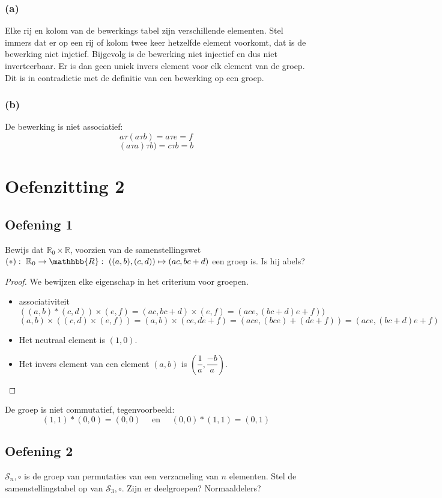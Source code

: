 \documentclass[main.tex]{subfiles}
\begin{document}
\subsubsection*{(a)}
Elke rij en kolom van de bewerkings tabel zijn verschillende elementen.
Stel immers dat er op een rij of kolom twee keer hetzelfde element voorkomt, dat is de bewerking niet injetief.
Bijgevolg is de bewerking niet injectief en dus niet inverteerbaar.
Er is dan geen uniek invers element voor elk element van de groep.
Dit is in contradictie met de definitie van een bewerking op een groep.

\subsubsection*{(b)}
De bewerking is niet associatief:
\[
a \tau (a \tau b)=a \tau e=f
\]
\[
(a \tau a) \tau b)=c \tau b=b
\]

\section{Oefenzitting 2}
\subsection*{Oefening 1}

Bewijs dat $\mathbb{R}_0 \times \mathbb{R}$, voorzien van de samenstellingswet $(*):\ \mathbb{R}_{0}\rightarrow \mathhbb{R}:\ ((a,b),(c,d)) \mapsto (ac,bc+d)$ een groep is.
Is hij abels?
\begin{proof} 
We bewijzen elke eigenschap in het criterium voor groepen.
\begin{itemize}
  \item associativiteit
  \[
  ((a,b)*(c,d))\times (e,f)=(ac,bc+d)\times (e,f)=(ace,(bc+d)e+f))
  \]
  \[
  (a,b) \times ((c,d) \times (e,f))=(a,b) \times
  (ce,de+f)=(ace,(bce)+(de+f))=(ace,(bc+d)e+f)
  \]
  \item Het neutraal element is $(1,0)$. 
  \item Het invers element van een element $(a,b)$ is  $(\dfrac{1}{a},\dfrac{-b}{a})$.
\end{itemize}
\end{proof}
De groep is niet commutatief, tegenvoorbeeld:
\[
(1,1)*(0,0) = (0,0) \quad\text{ en }\quad (0,0)*(1,1) = (0,1)
\]

\subsection*{Oefening 2}
$\mathcal{S}_{n},\circ$ is de groep van permutaties van een verzameling van $n$ elementen.
Stel de samenstellingstabel op van $\mathcal{S}_{3},\circ$.
Zijn er deelgroepen?
Normaaldelers? 
\end{document}
